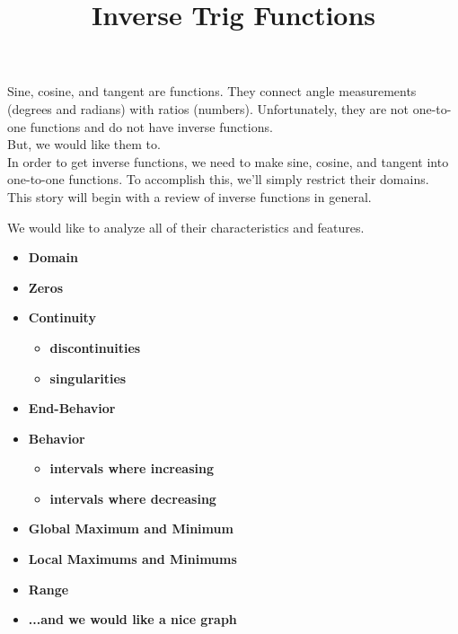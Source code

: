 \documentclass{ximera}
\title{Inverse Trig Functions}
\begin{document}
\begin{abstract}
%
\end{abstract}
\maketitle




Sine, cosine, and tangent are functions. They connect angle measurements (degrees and radians) with ratios (numbers). Unfortunately, they are not one-to-one functions and do not have inverse functions. \\

But, we would like them to.\\

In order to get inverse functions, we need to make sine, cosine, and tangent into one-to-one functions.  To accomplish this, we'll simply restrict their domains. \\


This story will begin with a review of inverse functions in general.



We would like to analyze all of their characteristics and features. \\



\begin{itemize}
\item \textbf{\textcolor{red!80!black}{Domain}} 
\item \textbf{\textcolor{red!80!black}{Zeros}} 
\item \textbf{\textcolor{red!80!black}{Continuity}} 
  \begin{itemize}
     \item \textbf{\textcolor{purple!85!blue}{discontinuities}} 
     \item \textbf{\textcolor{purple!85!blue}{singularities}} 
  \end{itemize}
\item \textbf{\textcolor{red!80!black}{End-Behavior}} 
\item \textbf{\textcolor{red!80!black}{Behavior}} 
  \begin{itemize}
     \item \textbf{\textcolor{purple!85!blue}{intervals where increasing}} 
     \item \textbf{\textcolor{purple!85!blue}{intervals where decreasing}} 
  \end{itemize}
\item \textbf{\textcolor{red!80!black}{Global Maximum and Minimum}} 
\item \textbf{\textcolor{red!80!black}{Local Maximums and Minimums}} 
\item \textbf{\textcolor{red!80!black}{Range}} 
\item \textbf{\textcolor{blue!55!black}{...and we would like a nice graph}} 
\end{itemize}
\end{document}
